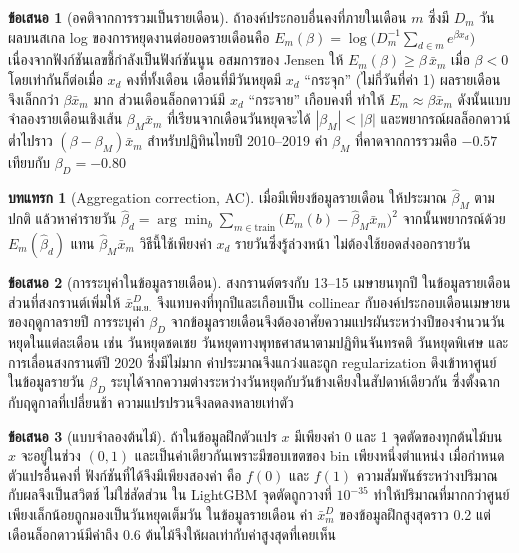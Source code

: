 \documentclass{article}
\theoremstyle{definition}
\newtheorem{proposition}{ข้อเสนอ}
\newtheorem{corollary}{บทแทรก}
\begin{document}
\begin{proposition}[อคติจากการรวมเป็นรายเดือน]\label{prop:jensen}
ถ้าองค์ประกอบอื่นคงที่ภายในเดือน $m$ ซึ่งมี $D_m$ วัน ผลบนสเกล log ของการหยุดงานต่อยอดรายเดือนคือ $E_m(\beta)=\log\bigl(D_m^{-1}\sum_{d\in m} e^{\beta x_d}\bigr)$ เนื่องจากฟังก์ชันเลขชี้กำลังเป็นฟังก์ชันนูน อสมการของ Jensen ให้ $E_m(\beta)\ge \beta\,\bar x_m$ เมื่อ $\beta<0$ โดยเท่ากันก็ต่อเมื่อ $x_d$ คงที่ทั้งเดือน เดือนที่มีวันหยุดมี $x_d$ “กระจุก” (ไม่กี่วันที่ค่า 1) ผลรายเดือนจึงเล็กกว่า $\beta\bar x_m$ มาก ส่วนเดือนล็อกดาวน์มี $x_d$ “กระจาย” เกือบคงที่ ทำให้ $E_m\approx\beta\bar x_m$ ดังนั้นแบบจำลองรายเดือนเชิงเส้น $\beta_M\bar x_m$ ที่เรียนจากเดือนวันหยุดจะได้ $|\beta_M|<|\beta|$ และพยากรณ์ผลล็อกดาวน์ต่ำไปราว $(\beta-\beta_M)\bar x_m$ สำหรับปฏิทินไทยปี 2010--2019 ค่า $\beta_M$ ที่คาดจากการรวมคือ $-0.57$ เทียบกับ $\beta_D=-0.80$
\end{proposition}

\begin{corollary}[Aggregation correction, AC]\label{cor:ac}
เมื่อมีเพียงข้อมูลรายเดือน ให้ประมาณ $\hat\beta_M$ ตามปกติ แล้วหาค่ารายวัน $\hat\beta_d=\arg\min_b\sum_{m\in\text{train}}\bigl(E_m(b)-\hat\beta_M\bar x_m\bigr)^2$ จากนั้นพยากรณ์ด้วย $E_m(\hat\beta_d)$ แทน $\hat\beta_M\bar x_m$ วิธีนี้ใช้เพียงค่า $x_d$ รายวันซึ่งรู้ล่วงหน้า ไม่ต้องใช้ยอดส่งออกรายวัน
\end{corollary}

\begin{proposition}[การระบุค่าในข้อมูลรายเดือน]\label{prop:ident}
สงกรานต์ตรงกับ 13--15 เมษายนทุกปี ในข้อมูลรายเดือนส่วนที่สงกรานต์เพิ่มให้ $\bar x^D_{\text{เม.ย.}}$ จึงแทบคงที่ทุกปีและเกือบเป็น collinear กับองค์ประกอบเดือนเมษายนของฤดูกาลรายปี การระบุค่า $\beta_D$ จากข้อมูลรายเดือนจึงต้องอาศัยความแปรผันระหว่างปีของจำนวนวันหยุดในแต่ละเดือน เช่น วันหยุดชดเชย วันหยุดทางพุทธศาสนาตามปฏิทินจันทรคติ วันหยุดพิเศษ และการเลื่อนสงกรานต์ปี 2020 ซึ่งมีไม่มาก ค่าประมาณจึงแกว่งและถูก regularization ดึงเข้าหาศูนย์ ในข้อมูลรายวัน $\beta_D$ ระบุได้จากความต่างระหว่างวันหยุดกับวันข้างเคียงในสัปดาห์เดียวกัน ซึ่งตั้งฉากกับฤดูกาลที่เปลี่ยนช้า ความแปรปรวนจึงลดลงหลายเท่าตัว
\end{proposition}

\begin{proposition}[แบบจำลองต้นไม้]\label{prop:tree}
ถ้าในข้อมูลฝึกตัวแปร $x$ มีเพียงค่า 0 และ 1 จุดตัดของทุกต้นไม้บน $x$ จะอยู่ในช่วง $(0,1)$ และเป็นค่าเดียวกันเพราะมีขอบเขตของ bin เพียงหนึ่งตำแหน่ง เมื่อกำหนดตัวแปรอื่นคงที่ ฟังก์ชันที่ได้จึงมีเพียงสองค่า คือ $f(0)$ และ $f(1)$ ความสัมพันธ์ระหว่างปริมาณกับผลจึงเป็นสวิตช์ ไม่ใช่สัดส่วน ใน LightGBM จุดตัดถูกวางที่ $10^{-35}$ ทำให้ปริมาณที่มากกว่าศูนย์เพียงเล็กน้อยถูกมองเป็นวันหยุดเต็มวัน ในข้อมูลรายเดือน ค่า $\bar x^D_m$ ของข้อมูลฝึกสูงสุดราว 0.2 แต่เดือนล็อกดาวน์มีค่าถึง 0.6 ต้นไม้จึงให้ผลเท่ากับค่าสูงสุดที่เคยเห็น
\end{proposition}
\end{document}
